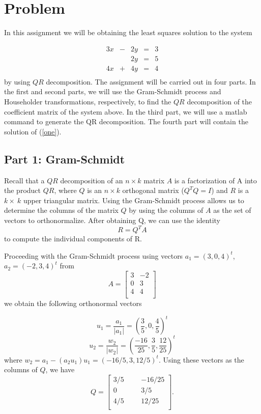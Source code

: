 \documentclass[a4paper, 12pt, twoside]{article}
\begin{document}
\section{Problem}
In this assignment we will be obtaining the least squares solution to the system

\begin{equation}
\label{one}
\begin{array}{rrrrr}
3x& - & 2y &= & 3 \\
  &   & 2y &= & 5\\
4x& + & 4y &= & 4\\ 
\end{array}
\end{equation}
by using $QR$ decomposition. The assignment will be carried out in four parts. In the first and second parts, we will use the Gram-Schmidt process and Householder transformations, respectively, to find the $QR$ decomposition of the coefficient matrix of the system above. In the third part, we will use a matlab command to generate the QR decomposition. The fourth part will contain the solution of (\ref{one}).

\subsection{Part 1: Gram-Schmidt}
Recall that a $QR$ decomposition of an $n \times k$ matrix $A$ is a factorization of A into the product $QR$, where $Q$ is an $n \times k$ orthogonal matrix ($Q^TQ = I$) and $R$ is a $k \times \ k$ upper triangular matrix.
Using the Gram-Schmidt process allows us to determine the columns of the matrix $Q$ by using the columns of $A$ as the set of vectors to orthonormalize. After obtaining Q, we can use the identity 
\begin{equation}
R = Q^TA
\end{equation}
to compute the individual components of R.

Proceeding with the Gram-Schmidt process using vectors $a_1 = (3,0,4)^t$,
$a_2 = (-2, 3, 4)^t$ from
$$
A=
\begin{bmatrix}
	3 & -2\\ 0 & 3\\ 4 & 4\\
\end{bmatrix}
$$
we obtain the following orthonormal vectors

$$ u_1 = \frac{a_1}{\lvert a_1 \rvert} = (\frac{3}{5},0,\frac{4}{5})^t$$
$$u_2 = \frac{w_2}{\lvert w_2 \rvert} = (\frac{-16}{25}, \frac{3}{5}, \frac{12}{25})^t$$
where $w_2 = {a_1} - (a_2u_1)u_1 = (-16/5, 3, 12/5)^t$. Using these vectors as the columns of $Q$, we have
$$
Q = 
\begin{bmatrix}
	3/5& & &-16/25\\
	0& & &	3/5\\
	4/5& & & 12/25\\	
\end{bmatrix}.
$$
\end{document}
